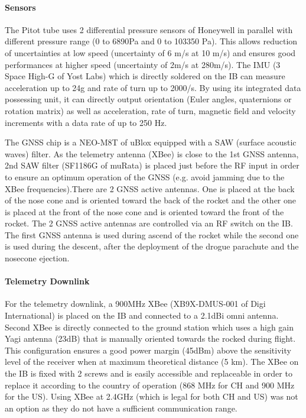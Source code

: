 \paragraph{Sensors}
 \hfill \break
The Pitot tube uses 2 differential pressure sensors of Honeywell in parallel with different pressure range (0 to 6890Pa and 0 to 103350 Pa). This allows reduction of uncertainties at low speed (uncertainty of 6 m/s at 10 m/s) and ensures good performances at higher speed (uncertainty of 2m/s at 280m/s).
The IMU (3 Space High-G of Yost Labs) which is directly soldered on the IB can measure acceleration up to 24g and rate of turn up to 2000/s.
By using its integrated data possessing unit, it can directly output orientation (Euler angles, quaternions or rotation matrix) as well as acceleration, rate of turn, magnetic field and velocity increments with a data rate of up to 250 Hz.

The GNSS chip is a NEO-M8T of uBlox equipped with a SAW (surface acoustic waves) filter. As the telemetry antenna (XBee) is close to the 1st GNSS antenna, 2nd SAW filter (SF1186G of muRata) is placed just before the RF input in order to ensure an optimum operation of the GNSS (e.g. avoid jamming due to the XBee frequencies).There are 2 GNSS active antennas. One is placed at the back of the nose cone and is oriented toward the back of the rocket and the other one is placed at the front of the nose cone and is oriented toward the front of the rocket. The 2 GNSS active antennas are controlled via an RF switch on the IB. The first GNSS antenna is used during ascend of the rocket while the second one is used during the descent, after the deployment of the drogue parachute and the nosecone ejection.

\paragraph{Telemetry Downlink}
 \hfill \break
For the telemetry downlink, a 900MHz XBee (XB9X-DMUS-001 of Digi International) is placed on the IB and connected to a 2.1dBi omni antenna. Second XBee is directly connected to the ground station which uses a high gain Yagi antenna (23dB) that is manually oriented towards the rocked during flight. This configuration ensures a good power margin (45dBm) above the sensitivity level of the receiver when at maximum theoretical distance (5 km). The XBee on the IB is fixed with 2 screws and is easily accessible and replaceable in order to replace it according to the country of operation (868 MHz for CH and 900 MHz for the US). Using XBee at 2.4GHz (which is legal for both CH and US) was not an option as they do not have a sufficient communication range.

